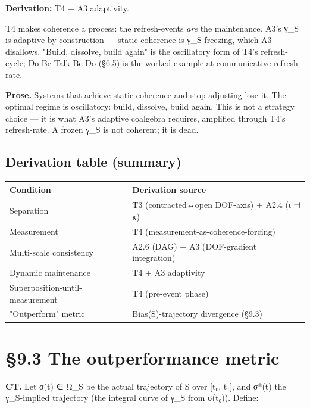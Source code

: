 \documentclass[11pt, openany]{book}
\newcommand{\sectionbreak}{\clearpage}
\begin{document}
\textbf{Derivation:} T4 + A3 adaptivity.

T4 makes coherence a process: the refresh-events \textit{are} the maintenance. A3's γ\_\allowbreak{}S is adaptive by construction --- static coherence is γ\_\allowbreak{}S freezing, which A3 disallows. "Build, dissolve, build again" is the oscillatory form of T4's refresh-cycle; Do Be Talk Be Do (§6.5) is the worked example at communicative refresh-rate.

\textbf{Prose.} Systems that achieve static coherence and stop adjusting lose it. The optimal regime is oscillatory: build, dissolve, build again. This is not a strategy choice --- it is what A3's adaptive coalgebra requires, amplified through T4's refresh-rate. A frozen γ\_\allowbreak{}S is not coherent; it is dead.

\subsection{Derivation table (summary)}

\begingroup\setlength{\tabcolsep}{3pt}\renewcommand{\arraystretch}{1.15}\footnotesize
\begin{center}
\begin{tabular}{p{1.81in} p{2.57in}}
\toprule
Condition & Derivation source \\
\midrule
Separation & T3 (contracted↔open DOF-axis) + A2.4 (ι ⊣ κ) \\
Measurement & T4 (measurement-as-coherence-forcing) \\
Multi-scale consistency & A2.6 (DAG) + A3 (DOF-gradient integration) \\
Dynamic maintenance & T4 + A3 adaptivity \\
Superposition-until-measurement & T4 (pre-event phase) \\
"Outperform" metric & Bias(S)-trajectory divergence (§9.3) \\
\bottomrule
\end{tabular}
\end{center}
\endgroup
\sectionbreak

\section{§9.3 The outperformance metric}

\textbf{CT.} Let σ(t) ∈ Ω\_\allowbreak{}S be the actual trajectory of S over [t₀, t₁], and σ*(t) the γ\_\allowbreak{}S-implied trajectory (the integral curve of γ\_\allowbreak{}S from σ(t₀)). Define:
\end{document}
